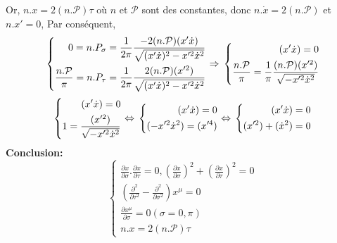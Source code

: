 \documentclass[a4paper,12pt]{article}
\def\xmu{x^\mu}
\begin{document}
Or, $n.x=2(n.\mathcal{P})\tau$ où $n$ et $\mathcal{P}$ sont des constantes,
donc $n.\dot{x}=2(n.\mathcal{P})$ et $n.x'=0$,
Par conséquent, 
\begin{equation}
	\left\lbrace
	\begin{aligned}
	0=n.P_\sigma=\frac{1}{2\pi}\frac{-2(n.\mathcal{P})(x'\dot{x})}{\sqrt{(x'\dot{x})^2-x'^2\dot{x}^2}}\\
	\frac{n.\mathcal{P}}{\pi}=n.P_\tau=\frac{1}{2\pi}\frac{2(n.\mathcal{P}) (x'^2)}{\sqrt{(x'\dot{x})^2-x'^2\dot{x}^2}}
	\end{aligned}
	\right.
	\Rightarrow\\
	\left\lbrace
	\begin{aligned}
	(x'\dot{x})=0\\
	\frac{n.\mathcal{P}}{\pi}=\frac{1}{\pi}\frac{(n.\mathcal{P}) (x'^2)}{\sqrt{-x'^2\dot{x}^2}}
	\end{aligned}
	\right.	
\end{equation}
\begin{equation}
	\left\lbrace
	\begin{aligned}
	(x'\dot{x})=0\\
	1=\frac{ (x'^2)}{\sqrt{-x'^2\dot{x}^2}}
	\end{aligned}
	\right.
	\Leftrightarrow\\
	\left\lbrace
	\begin{aligned}
	(x'\dot{x})=0\\
	(-x'^2\dot{x}^2)=(x'^4)
	\end{aligned}
	\right.	
	\Leftrightarrow\\
	\left\lbrace
	\begin{aligned}
	(x'\dot{x})=0\\
	(x'^2)+(\dot{x}^2)=0
	\end{aligned}
	\right.	
\end{equation}
\textbf{Conclusion:}
\begin{equation}
	\left\lbrace
    \begin{aligned}
        \frac{\partial x}{\partial \sigma}.\frac{\partial x}{\partial \tau}=0, \left( \frac{\partial x}{\partial \sigma}\right) ^2+\left( \frac{\partial x}{\partial \tau}\right) ^2=0\\
        \left( \frac{\partial^2}{\partial  \tau^2}-\frac{\partial^2}{\partial  \sigma^2}\right) \xmu=0\\
        \frac{\partial \xmu}{\partial \sigma}=0 	 (\sigma=0,\pi)\\
        n.x=2(n.\mathcal{P})\tau
        \end{aligned}
        \right.
\end{equation}
\end{document}
